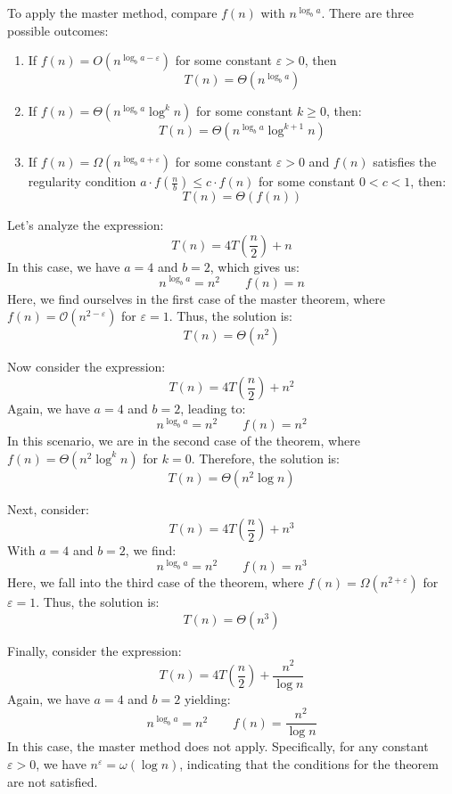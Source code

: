 To apply the master method, compare $f(n)$ with $n^{\log_ba}$. 
There are three possible outcomes:
\begin{enumerate}
    \item If $f(n)=O(n^{\log_ba-\varepsilon})$ for some constant $\varepsilon > 0$, then
        \[T(n)=\Theta(n^{\log_ba})\]
    \item If $f(n)=\Theta(n^{\log_ba}\log^kn)$ for some constant $k \geq 0$, then: 
        \[T(n)=\Theta(n^{\log_ba}\log^{k+1}n)\]
    \item If $f(n)=\Omega(n^{\log_ba+\varepsilon})$ for some constant $\varepsilon > 0$ and $f(n)$ satisfies the regularity condition $a \cdot f\left(\frac{n}{b}\right) \leq c \cdot f(n)$ for some constant $0 < c < 1$, then:
        \[T(n)=\Theta(f(n))\]
\end{enumerate}
\begin{example}
    Let's analyze the expression:
    \[T(n)=4T\left(\frac{n}{2}\right)+n\]
    In this case, we have $a=4$ and $b=2$, which gives us:
    \[n^{\log_ba}=n^2 \qquad f(n)=n\]
    Here, we find ourselves in the first case of the master theorem, where $f(n)=\mathcal{O}(n^{2-\varepsilon})$ for $\varepsilon=1$. 
    Thus, the solution is:
    \[T(n)=\Theta(n^2)\]

    Now consider the expression:
    \[T(n)=4T\left(\frac{n}{2}\right)+n^2\]
    Again, we have $a=4$ and $b=2$, leading to:
    \[n^{\log_ba}=n^2 \qquad f(n)=n^2\]
    In this scenario, we are in the second case of the theorem, where $f(n)=\Theta(n^2\log^kn)$ for $k=0$. 
    Therefore, the solution is:
    \[T(n)=\Theta(n^2\log n)\]

    Next, consider:
    \[T(n)=4T\left(\frac{n}{2}\right)+n^3\]
    With $a=4$ and $b=2$, we find:
    \[n^{\log_ba}=n^2 \qquad f(n)=n^3\]
    Here, we fall into the third case of the theorem, where $f(n)=\Omega(n^{2+\varepsilon})$ for $\varepsilon=1$. 
    Thus, the solution is:
    \[T(n)=\Theta(n^3)\]

    Finally, consider the expression:
    \[T(n)=4T\left(\frac{n}{2}\right)+\frac{n^2}{\log n}\]
    Again, we have $a=4$ and $b=2$ yielding:
    \[n^{\log_ba}=n^2 \qquad f(n)=\frac{n^2}{\log n}\]
    In this case, the master method does not apply. 
    Specifically, for any constant $\varepsilon > 0$, we have $n^\varepsilon = \omega(\log n)$, indicating that the conditions for the theorem are not satisfied.
\end{example}